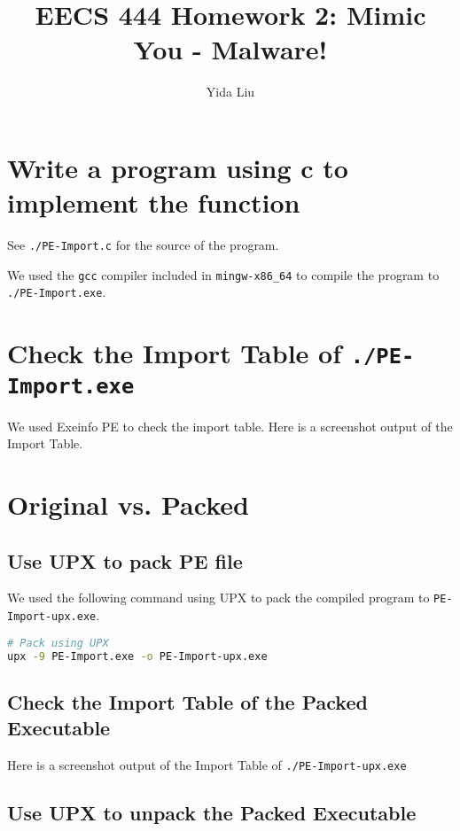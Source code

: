\documentclass[11pt]{article}
\begin{document}
\author{Yida Liu}
\title{EECS 444 Homework 2: Mimic You - Malware!}
\maketitle


\section{Write a program using c to implement the function}

See \lstinline{./PE-Import.c} for the source of the program.

We used the \lstinline{gcc} compiler included in \lstinline{mingw-x86_64} to compile the program to \lstinline{./PE-Import.exe}.

\section{Check the Import Table of \lstinline{./PE-Import.exe}}

We used Exeinfo PE to check the import table. Here is a screenshot output of the Import Table.

\section{Original vs. Packed}

\subsection{Use UPX to pack PE file}

We used the following command using UPX to pack the compiled program to \lstinline{PE-Import-upx.exe}.

\begin{lstlisting}[language=bash]
# Pack using UPX
upx -9 PE-Import.exe -o PE-Import-upx.exe
\end{lstlisting}

\subsection{Check the Import Table of the Packed Executable}

Here is a screenshot output of the Import Table of \lstinline{./PE-Import-upx.exe} 

\subsection{Use UPX to unpack the Packed Executable}
\end{document}
